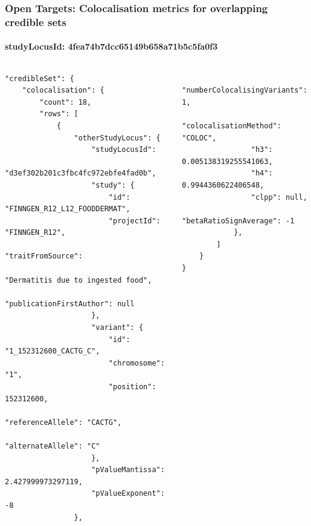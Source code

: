 \documentclass[aspectratio=169,xcolor=dvipsnames]{beamer}
\begin{document}
\begin{frame}[fragile,t]
  \frametitle{Open Targets: Colocalisation metrics for overlapping credible sets}
  \framesubtitle{studyLocusId: 4fea74b7dcc65149b658a71b5c5fa0f3}
  \tiny
  \begin{columns}[t]
    \begin{column}{0.5\textwidth}
\begin{verbatim}
"credibleSet": {
    "colocalisation": {
        "count": 18,
        "rows": [
            {
                "otherStudyLocus": {
                    "studyLocusId":
                        "d3ef302b201c3fbc4fc972ebfe4fad0b",
                    "study": {
                        "id": "FINNGEN_R12_L12_FOODDERMAT",
                        "projectId": "FINNGEN_R12",
                        "traitFromSource":
                            "Dermatitis due to ingested food",
                        "publicationFirstAuthor": null
                    },
                    "variant": {
                        "id": "1_152312600_CACTG_C",
                        "chromosome": "1",
                        "position": 152312600,
                        "referenceAllele": "CACTG",
                        "alternateAllele": "C"
                    },
                    "pValueMantissa": 2.427999973297119,
                    "pValueExponent": -8
                },
\end{verbatim}
    \end{column}
    \begin{column}{0.5\textwidth}
\begin{verbatim}
                "numberColocalisingVariants": 1,
                "colocalisationMethod": "COLOC",
                "h3": 0.005138319255541063,
                "h4": 0.9944360622406548,
                "clpp": null,
                "betaRatioSignAverage": -1
            },
        ]
    }
}
\end{verbatim}
    \end{column}
  \end{columns}
\end{frame}
\end{document}
